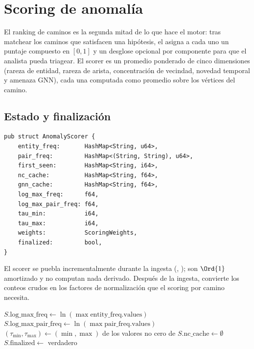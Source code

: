 \chapter{Scoring de anomalía}
\label{ch:anomaly}

El ranking de caminos es la segunda mitad de lo que hace el
motor: tras matchear los caminos que satisfacen una hipótesis, el
\Scorer{} asigna a cada uno un puntaje compuesto en $[0, 1]$ y
un desglose opcional por componente para que el analista pueda
triagear. El scorer es un promedio ponderado de cinco dimensiones
(rareza de entidad, rareza de arista, concentración de vecindad,
novedad temporal y amenaza GNN), cada una computada como promedio
sobre los vértices del camino.

\section{Estado y finalización}

\begin{lstlisting}[style=rust]
pub struct AnomalyScorer {
    entity_freq:       HashMap<String, u64>,
    pair_freq:         HashMap<(String, String), u64>,
    first_seen:        HashMap<String, i64>,
    nc_cache:          HashMap<String, f64>,
    gnn_cache:         HashMap<String, f64>,
    log_max_freq:      f64,
    log_max_pair_freq: f64,
    tau_min:           i64,
    tau_max:           i64,
    weights:           ScoringWeights,
    finalized:         bool,
}
\end{lstlisting}

El scorer se puebla incrementalmente durante la ingesta
(, ); son $\Ord{1}$
amortizado y no computan nada derivado. Después de la ingesta,
 convierte los conteos crudos en los factores de
normalización que el scoring por camino necesita.

\begin{algorithm}
\caption{\textsc{Anomaly-Finalize}}\label{alg:anomaly-finalize}
$S.\text{log\_max\_freq} \gets \ln(\max \text{entity\_freq.values})$\;
$S.\text{log\_max\_pair\_freq} \gets \ln(\max \text{pair\_freq.values})$\;
$(\tau_{\min}, \tau_{\max}) \gets (\min, \max)$ de los valores no
cero de \;
$S.\text{nc\_cache} \gets \emptyset$\;
$S.\text{finalized} \gets $ verdadero\;
\end{algorithm}

